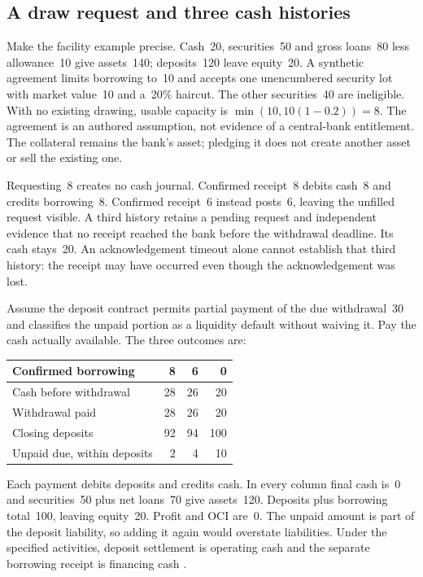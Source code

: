 \subsection{A draw request and three cash histories}\label{sec:bank-funding-settlement}

Make the facility example precise. Cash~20, securities~50 and gross loans~80
less allowance~10 give assets~140; deposits~120 leave equity~20. A synthetic
agreement limits borrowing to~10 and accepts one unencumbered security lot
with market value~10 and a~20\% haircut. The other securities~40 are ineligible.
With no existing drawing, usable capacity is
$\min(10,10(1-0.2))=8$. The agreement is an authored assumption, not evidence
of a central-bank entitlement. The collateral remains the bank's asset;
pledging it does not create another asset or sell the existing one.

Requesting~8 creates no cash journal. Confirmed receipt~8 debits cash~8 and
credits borrowing~8. Confirmed receipt~6 instead posts~6, leaving the unfilled
request visible. A third history retains a pending request and independent
evidence that no receipt reached the bank before the withdrawal deadline.
Its cash stays~20. An acknowledgement timeout alone cannot establish that
third history: the receipt may have occurred even though the acknowledgement
was lost.

Assume the deposit contract permits partial payment of the due withdrawal~30
and classifies the unpaid portion as a liquidity default without waiving it.
Pay the cash actually available. The three outcomes are:

\begin{center}
\begin{tabular}{lrrr}
\toprule
Confirmed borrowing & 8 & 6 & 0\\
\midrule
Cash before withdrawal & 28 & 26 & 20\\
Withdrawal paid & 28 & 26 & 20\\
Closing deposits & 92 & 94 & 100\\
Unpaid due, within deposits & 2 & 4 & 10\\
\bottomrule
\end{tabular}
\end{center}

Each payment debits deposits and credits cash. In every column final cash
is~0 and securities~50 plus net loans~70 give assets~120. Deposits plus borrowing
total~100, leaving equity~20. Profit and OCI are~0. The unpaid amount is part
of the deposit liability, so adding it again would overstate liabilities.
Under the specified activities, deposit settlement is operating cash and
the separate borrowing receipt is financing cash
\citep[paragraphs~14--17]{aasb107dated}.

